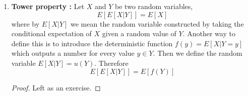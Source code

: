 \begin{enumerate}
\begin{proof}
\begin{align*}
     &= \left( \sum_{x \in S_X} xP(X=x)\right)\left( \sum_{y \in S_Y} yP(Y=y)\right)= E[X]E[Y]
    \end{align*}
    \end{proof}
    \item {\bf Tower property \cite[Theorem 3.5.2]{evans}:} Let $X$ and $Y$ be two random variables,  
   \begin{equation*}
   E[E[X|Y]] = E[X]
   \end{equation*}
   where by $E[X|Y]$ we mean the random variable constructed by taking the conditional expectation of $X$ given a random value of $Y$. Another way to define this is to introduce the deterministic function  $f(y) = E[X|Y=y]$ which outputs a number for every value $y \in Y$. Then we define the random variable $E[X|Y] = u(Y)$.  Therefore
   \begin{equation*}
   E[E[X|Y]]  = E[f(Y)] 
   \end{equation*}
   \begin{proof}
   Left as an exercise. 
   \end{proof}
  \end{enumerate}

  
  
